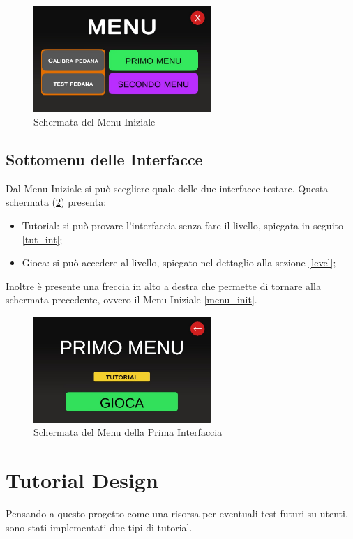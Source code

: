 \documentclass[target=bach,aauheader=]{thud}
\begin{document}
\begin{figure}[h]
    \centering
    \includegraphics[width=0.60\textwidth]{menu_screen}
    \caption{Schermata del Menu Iniziale}
    \label{fig:menu_screen}
\end{figure}

\subsection{Sottomenu delle Interfacce}
\label{menu_int}
Dal Menu Iniziale si può scegliere quale delle due interfacce testare.
Questa schermata (\ref{fig:first_menu}) presenta:
\begin{itemize}
    \item Tutorial: si può provare l'interfaccia senza fare il livello, spiegata in seguito \ref{tut_int};
    \item Gioca: si può accedere al livello, spiegato nel dettaglio alla sezione \ref{level};
\end{itemize}
Inoltre è presente una freccia in alto a destra che permette di tornare alla schermata precedente, ovvero il Menu Iniziale \ref{menu_init}.

\begin{figure}[h]
    \centering
    \includegraphics[width=0.60\textwidth]{first_menu}
    \caption{Schermata del Menu della Prima Interfaccia}
    \label{fig:first_menu}
\end{figure}

\section{Tutorial Design}
Pensando a questo progetto come una risorsa per eventuali test futuri su utenti, sono stati implementati due tipi di tutorial.
\end{document}
